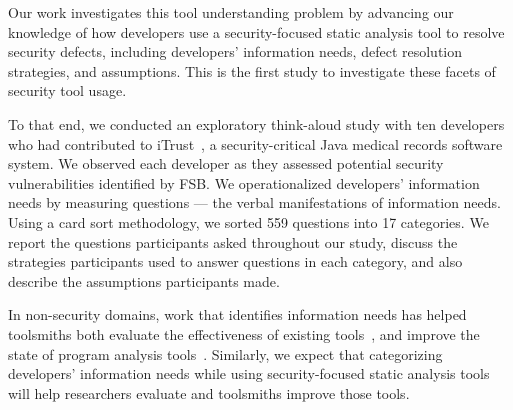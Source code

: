 \documentclass[10pt,journal,compsoc]{IEEEtran}
\begin{document}
Our work investigates this tool understanding problem by advancing our knowledge of how developers use a security-focused static analysis tool to resolve security defects, including developers' information needs, defect resolution strategies, and assumptions.
This is the first study to investigate these facets of security tool usage. 

To that end, we conducted an exploratory think-aloud study with ten developers who had contributed to iTrust~\cite{iTrust}, a security-critical Java medical records software system.
We observed each developer as they assessed potential security vulnerabilities identified by FSB. 
We operationalized developers' information needs by measuring questions --- the verbal manifestations of information needs.
Using a card sort methodology, we sorted 559 questions into 17 categories. 
We report the questions participants asked throughout our study, discuss the strategies participants used to answer questions in each category, and also describe the assumptions participants made.



In non-security domains, work that identifies information needs has helped toolsmiths both evaluate the effectiveness of existing tools~\cite{ammar2012empirical}, and improve the state of program analysis tools~\cite{kononenko2012automatically, servant2012history, yoon2013visualization}. 
Similarly, we expect that categorizing developers' information needs while using security-focused static analysis tools will help researchers evaluate and toolsmiths improve those tools. 






\end{document}
